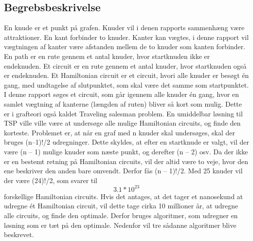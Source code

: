 \subsection{Begrebsbeskrivelse}
En knude er et punkt på grafen. Knuder vil i denen rapports sammenhæng være attraktioner. \newline
En kant forbinder to knuder. Kanter kan vægtes, i denne rapport vil vægtningen af kanter være afstanden mellem de to knuder som kanten forbinder. \newline
En path er en rute gennem et antal knuder, hvor startknuden ikke er endeknuden. \newline
Et circuit er en rute gennem et antal knuder, hvor startknuden også er endeknuden. \newline
Et  Hamiltonian circuit er et circuit, hvori alle knuder er besøgt én gang, med undtagelse af slutpunktet, som skal være det samme som startpunktet. \newline
I denne rapport søges et circuit, som går igennem alle knuder én gang, hvor en samlet vægtning af kanterne (længden af ruten) bliver så kort som mulig. Dette er i grafteori også kaldet Traveling salesman problem. En umiddelbar løsning til TSP ville ville være at undersøge alle mulige Hamiltonian circuits, og finde den korteste. Problemet er, at når en graf med n knuder skal undersøges, skal der bruges (n–1)!/2 udregninger. Dette skyldes, at efter en startknude er valgt, vil der være (n – 1) mulige knuder som næste punkt, og derefter (n – 2) osv. Da der ikke er en bestemt retning på Hamiltonian circuits, vil der altid være to veje, hvor den ene beskriver den anden  bare omvendt. Derfor fås (n – 1)!/2. 
Med 25 knuder vil der være (24)!/2, som svarer til \[3.1 * 10^{23}\] forskellige Hamiltonian circuits. Hvis det antages, at det tager et nanosekund at udregne ét Hamiltonian circuit, vil dette tage cirka 10 millioner år, at udregne alle circuits, og finde den optimale. Derfor bruges algoritmer, som udregner en løsning som er tæt på den optimale. Nedenfor vil tre sådanne algoritmer blive beskrevet. \citep{DisMat}


